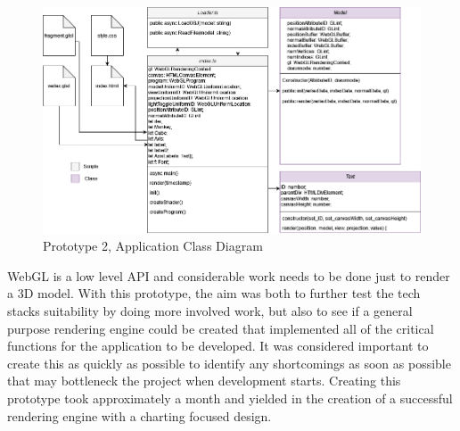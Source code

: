\begin{figure}
    \centering
    \includegraphics[width=1\columnwidth]{author-files/figures/UML_Prototype2fin.png}
    \caption{Prototype 2, Application Class Diagram}
    \label{fig:proto2class}
\end{figure}

\hfill

WebGL is a low level API and considerable work needs to be done just to render a 3D model. With this prototype, the aim was both to further test the tech stacks suitability by doing more involved work, but also to see if a general purpose rendering engine could be created that implemented all of the critical functions for the application to be developed. It was considered important to create this as quickly as possible to identify any shortcomings as soon as possible that may bottleneck the project when development starts. Creating this prototype took approximately a month and yielded in the creation of a successful rendering engine with a charting focused design.

